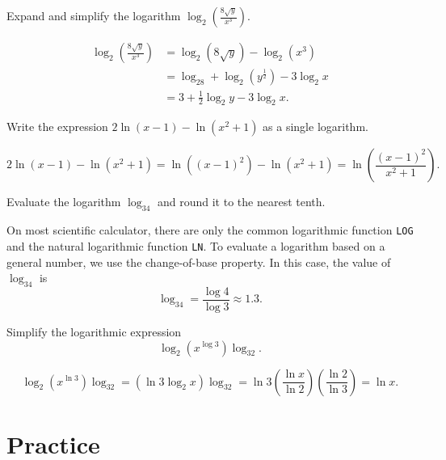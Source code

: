\documentclass[en,12pt]{elegantbook}
\let\BeginKnitrBlock\begin \let\EndKnitrBlock\end
\begin{document}
\BeginKnitrBlock{example}
\protect\hypertarget{exm:unnamed-chunk-292}{}{\label{exm:unnamed-chunk-292} }
Expand and simplify the logarithm \(\log_2\left(\frac{8\sqrt{y}}{x^3}\right)\).
\EndKnitrBlock{example}

\BeginKnitrBlock{solution}


\[
\begin{aligned}
\log_2\left(\frac{8\sqrt{y}}{x^3}\right)&=\log_2(8\sqrt{y})-\log_2(x^3)\\
&=\log_28+\log_2(y^{\frac{1}{2}})-3\log_2x\\
&=3+\frac{1}{2}\log_2y-3\log_2x.
\end{aligned}
\]
\EndKnitrBlock{solution}

\BeginKnitrBlock{example}
\protect\hypertarget{exm:unnamed-chunk-294}{}{\label{exm:unnamed-chunk-294} }
Write the expression \(2\ln(x-1)-\ln(x^2+1)\) as a single logarithm.
\EndKnitrBlock{example}

\BeginKnitrBlock{solution}


\[
2\ln(x-1)-\ln(x^2+1)=\ln((x-1)^2)-\ln(x^2+1)=\ln\left(\frac{(x-1)^2}{x^2+1}\right).
\]
\EndKnitrBlock{solution}

\BeginKnitrBlock{example}
\protect\hypertarget{exm:unnamed-chunk-296}{}{\label{exm:unnamed-chunk-296} }
Evaluate the logarithm \(\log_34\) and round it to the nearest tenth.
\EndKnitrBlock{example}

\BeginKnitrBlock{solution}


On most scientific calculator, there are only the common logarithmic function \texttt{LOG} and the natural logarithmic function \texttt{LN}. To evaluate a logarithm based on a general number, we use the change-of-base property. In this case, the value of \(\log_34\) is \[\log_34=\frac{\log4}{\log3}\approx 1.3.\]
\EndKnitrBlock{solution}

\BeginKnitrBlock{example}
\protect\hypertarget{exm:unnamed-chunk-298}{}{\label{exm:unnamed-chunk-298} }
Simplify the logarithmic expression
\[
\log_2(x^{\log 3})\log_32.
\]
\EndKnitrBlock{example}

\BeginKnitrBlock{solution}


\[
\log_2(x^{\ln 3})\log_32
=(\ln 3\log_2x)\log_32=\ln3\left(\frac{\ln x}{\ln 2}\right)\left(\frac{\ln 2}{\ln 3}\right)=\ln x.
\]
\EndKnitrBlock{solution}

\hypertarget{practice-16}{%
\section{Practice}\label{practice-16}}
\end{document}
